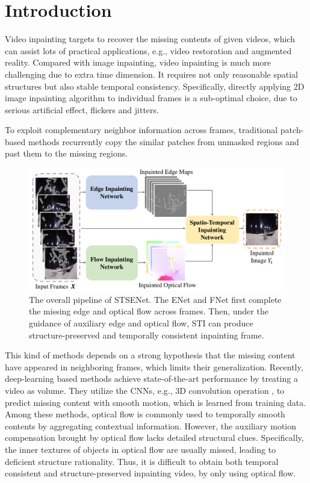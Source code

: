\section{Introduction}
\noindent Video inpainting targets to recover the missing contents of given videos, which can assist lots of practical applications, e.g., video restoration and augmented reality. Compared with image inpainting, video inpainting is much more challenging due to extra time dimension. It requires not only reasonable spatial structures but also stable temporal consistency. Specifically, directly applying 2D image inpainting algorithm \cite{yu2018free,Xiong_2019_CVPR} to individual frames is a sub-optimal choice, due to serious artificial effect, flickers and jitters. 

To exploit complementary neighbor information across frames, traditional patch-based methods \cite{patwardhan2007video,wexler2004space,newson2014video} recurrently copy the similar patches from unmasked regions and past them to the missing regions. 
\begin{figure}[t]
	\centering
	\includegraphics[width=1.0\columnwidth]{zong} %
	\caption{The overall pipeline of STSENet. The ENet and FNet first complete the missing edge and optical flow across frames. Then, under the guidance of auxiliary edge and optical flow, STI can produce structure-preserved and temporally consistent inpainting frame.}
	\label{zong}
\end{figure}
This kind of methods depends on a strong hypothesis that the missing content have appeared in neighboring frames, which limits their generalization.
Recently, deep-learning based methods achieve state-of-the-art performance by treating a video as volume.
They utilize the CNNs, e.g., 3D convolution operation \cite{wang2019video}, to predict missing content with smooth motion, which is learned from training data.
Among these methods, optical flow is commonly used to temporally smooth contents \cite{Xu_2019_CVPR,Kim_2019_CVPR,Kim_2019_CVPR1} by aggregating contextual information.
However, the auxiliary motion compensation brought by optical flow lacks detailed structural clues.
Specifically, the inner textures of objects in optical flow are usually missed, leading to deficient structure rationality.
Thus, it is difficult to obtain both temporal consistent and structure-preserved inpainting video, by only using optical flow.





